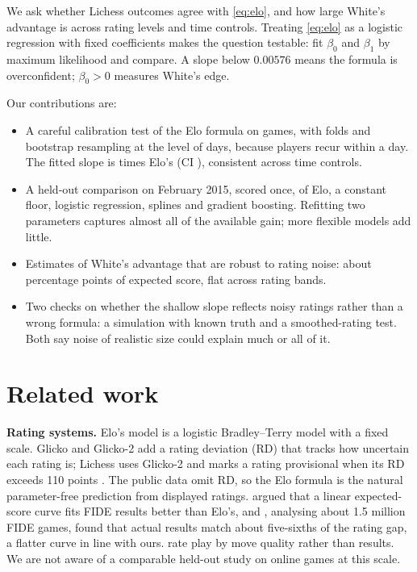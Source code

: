 \documentclass{article}
\begin{document}
We ask whether Lichess outcomes agree with \eqref{eq:elo}, and how large White's advantage is across rating levels and time controls. Treating \eqref{eq:elo} as a logistic regression with fixed coefficients makes the question testable: fit $\beta_0$ and $\beta_1$ by maximum likelihood and compare. A slope below $0.00576$ means the formula is overconfident; $\beta_0 > 0$ measures White's edge.

Our contributions are:
\begin{itemize}
  \item A careful calibration test of the Elo formula on \keptJan{} games, with folds and bootstrap resampling at the level of days, because players recur within a day. The fitted slope is \slopeRatio{} times Elo's (CI \slopeRatioCI), consistent across time controls.
  \item A held-out comparison on February 2015, scored once, of Elo, a constant floor, logistic regression, splines and gradient boosting. Refitting two parameters captures almost all of the available gain; more flexible models add little.
  \item Estimates of White's advantage that are robust to rating noise: about \advScorePct{} percentage points of expected score, flat across rating bands.
  \item Two checks on whether the shallow slope reflects noisy ratings rather than a wrong formula: a simulation with known truth and a smoothed-rating test. Both say noise of realistic size could explain much or all of it.
\end{itemize}

\section{Related work}
\label{sec:related}

\textbf{Rating systems.} Elo's model \citep{elo1978} is a logistic Bradley--Terry model \citep{bradley1952} with a fixed scale. Glicko \citep{glickman1999} and Glicko-2 \citep{glickman2001} add a rating deviation (RD) that tracks how uncertain each rating is; Lichess uses Glicko-2 and marks a rating provisional when its RD exceeds 110 points \citep{lichessfaq}. The public data omit RD, so the Elo formula is the natural parameter-free prediction from displayed ratings. \citet{sonas2002} argued that a linear expected-score curve fits FIDE results better than Elo's, and \citet{sonas2011}, analysing about 1.5 million FIDE games, found that actual results match about five-sixths of the rating gap, a flatter curve in line with ours. \citet{regan2011} rate play by move quality rather than results. We are not aware of a comparable held-out study on online games at this scale.
\end{document}
